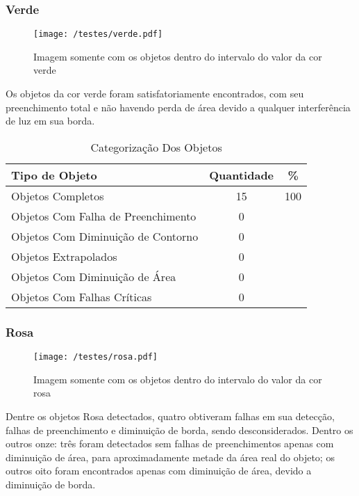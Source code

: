 \subsubsection{Verde}
\begin{figure}[H]
		\centering
		\texttt{[image: /testes/verde.pdf]}
		\caption{Imagem somente com os objetos dentro do intervalo do valor da cor verde}
		\label{disposicaoparte}
	\end{figure}

Os objetos da cor verde foram satisfatoriamente encontrados, com seu preenchimento total e não havendo perda de área devido a qualquer interferência de luz em sua borda.	
	
\begin{table}[h]
\centering
\begin{tabular}{l|c|c}
Tipo de Objeto & Quantidade & \% \\ %
\hline                               %
Objetos Completos &  15 &100 \\
\hline 
Objetos Com Falha de Preenchimento & 0\\
\hline 
Objetos Com Diminuição de Contorno &  0\\
\hline 
Objetos Extrapolados & 0 \\
\hline 
Objetos Com Diminuição de Área &  0 \\
\hline 
Objetos Com Falhas Críticas & 0 \\
\hline 
\end{tabular}
\caption{Categorização Dos Objetos}
\end{table}	
\subsubsection{Rosa}
	
	\begin{figure}[H]
		\centering
		\texttt{[image: /testes/rosa.pdf]}
		\caption{Imagem somente com os objetos dentro do intervalo do valor da cor rosa}
		\label{disposicaoparte}
	\end{figure}
	
Dentre os objetos Rosa detectados, quatro obtiveram falhas em sua detecção, falhas de preenchimento e diminuição de borda, sendo desconsiderados. Dentro os outros onze: três foram detectados sem falhas de preenchimentos apenas com diminuição de área, para aproximadamente metade da área real do objeto; os outros oito foram encontrados apenas com diminuição de área, devido a diminuição de borda.
	
